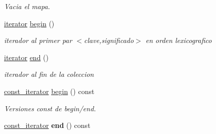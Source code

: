 \begin{DoxyCompactItemize}
\begin{DoxyCompactList}\small\item\em Vacia el mapa. \end{DoxyCompactList}\item 
\hyperlink{classstring__map_1_1iterator}{iterator} \hyperlink{classstring__map_aced2bd9493475515f3dc765a379484bd}{begin} ()
\begin{DoxyCompactList}\small\item\em iterador al primer par $<$clave,significado$>$ en orden lexicografico \end{DoxyCompactList}\item 
\hyperlink{classstring__map_1_1iterator}{iterator} \hyperlink{classstring__map_ab063b2f78945d192c5ef3ccc68db8e80}{end} ()
\begin{DoxyCompactList}\small\item\em iterador al fin de la coleccion \end{DoxyCompactList}\item 
\hypertarget{classstring__map_a978694b6ac9df86a1688d1e4a0642e52}{\hyperlink{classstring__map_1_1const__iterator}{const\-\_\-iterator} \hyperlink{classstring__map_a978694b6ac9df86a1688d1e4a0642e52}{begin} () const }\label{classstring__map_a978694b6ac9df86a1688d1e4a0642e52}

\begin{DoxyCompactList}\small\item\em Versiones const de begin/end. \end{DoxyCompactList}\item 
\hypertarget{classstring__map_a66b1f31d0b10c79f549d51e687ec5446}{\hyperlink{classstring__map_1_1const__iterator}{const\-\_\-iterator} {\bfseries end} () const }\label{classstring__map_a66b1f31d0b10c79f549d51e687ec5446}


\end{DoxyCompactItemize}

